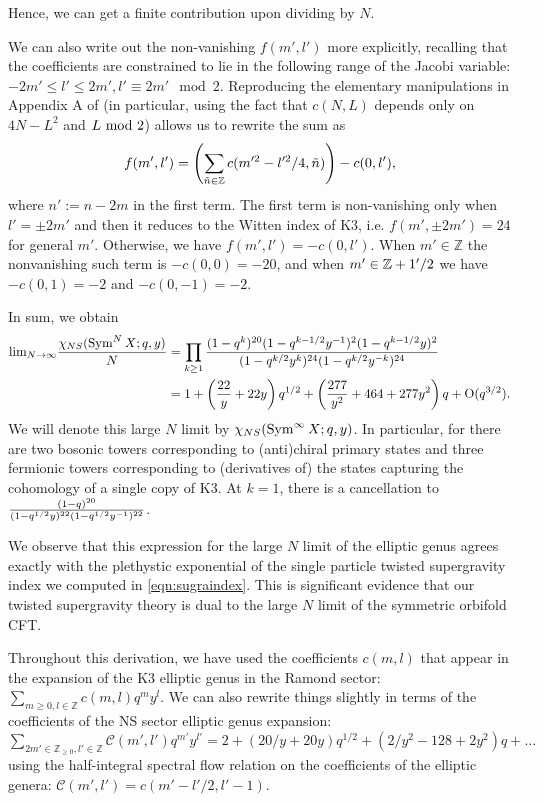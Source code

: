 \documentclass[../main.tex]{subfiles}
\begin{document}
Hence, we can get a finite contribution upon dividing by $N$. 

We can also write out the non-vanishing $f(m', l')$ more explicitly, recalling that the coefficients are constrained to lie in the following range of the Jacobi variable: $-2m' \leq l' \leq 2m', l' \equiv 2 m' \mod 2$. Reproducing the elementary manipulations in Appendix A of \cite{BKKP} (in particular, using the fact that $c(N, L)$ depends only on $4N-L^2$ and $L \ {\rm mod} \ 2$) allows us to rewrite the sum as
\begin{equation}\label{eq:fml1}
f(m', l') = \left( \sum_{\tilde{n} \in \mathbb Z}c(m'^2 - l'^2/4, \tilde{n}) \right) - c(0, l'),
\end{equation} where $n':= n - 2m$ in the first term. 
The first term is non-vanishing only when $l' = \pm 2 m'$ and then it reduces to the Witten index of K3, i.e. $f(m', \pm 2m') = 24$ for general $m'$. Otherwise, we have $f(m', l') = -c(0, l')$. When $m' \in \mathbb{Z}$ the nonvanishing such term is $-c(0, 0) = -20$, and when $m' \in \mathbb Z + 1'/2$ we have $-c(0, 1) = -2$ and $-c(0, -1) = -2$. 

In sum, we obtain
\begin{align}
{\rm lim}_{N \rightarrow \infty}{\chi_{NS}(\operatorname{Sym}^{N} X; q, y) \over N} &= \prod_{k \geq 1}{(1 - q^k)^{20}(1 - q^{k-1/2}y^{-1})^2(1 - q^{k-1/2}y)^2 \over (1 - q^{k/2}y^k)^{24}(1 - q^{k/2}y^{-k})^{24}} \\
&= 1 + \left({22 \over y} + 22 y \right)q^{1/2} + \left({277 \over y^2} + 464 + 277 y^2 \right)q + \text{O}(q^{3/2}).
\end{align} 
We will denote this large $N$ limit by $\chi_{NS}(\operatorname{Sym}^\infty X ; q,y)$. 
In particular, for there are two bosonic towers corresponding to (anti)chiral primary states and three fermionic towers corresponding to (derivatives of) the states capturing the cohomology of a single copy of K3. At $k=1$, there is a cancellation to ${(1 - q)^{20} \over (1 - q^{1/2}y)^{22}(1 - q^{1/2}y^{-1})^{22}}$.

We observe that this expression for the large $N$ limit of the elliptic genus agrees exactly with the plethystic exponential of the single particle twisted supergravity index we computed in \eqref{eqn:sugraindex}.
This is significant evidence that our twisted supergravity theory is dual to the large $N$ limit of the symmetric orbifold CFT.

Throughout this derivation, we have used the coefficients $c(m, l)$ that appear in the expansion of the K3 elliptic genus in the Ramond sector: $\sum_{m \geq 0, l \in \mathbb{Z}} c(m, l) q^m y^l$. We can also rewrite things slightly in terms of the coefficients of the NS sector elliptic genus expansion: $\sum_{2 m' \in \mathbb{Z}_{\geq 0}, l' \in \mathbb{Z}} \mathcal{C}(m', l') q^{m'} y^{l'} = 2 + (20/y + 20 y)q^{1/2} + (2/y^2 - 128 + 2 y^2)q + \ldots$ using the half-integral spectral flow relation on the coefficients of the elliptic genera: $\mathcal{C}(m', l') = c(m'-l'/2, l'-1)$. 
\end{document}
